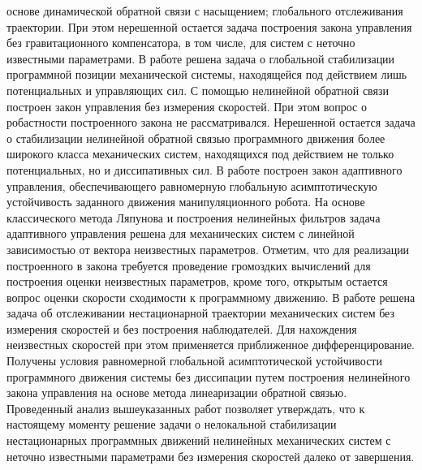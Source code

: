{основе динамической обратной связи с насыщением; глобального отслеживания траектории. При этом нерешенной остается задача построения закона управления без гравитационного компенсатора, в том числе, для систем с неточно известными параметрами. В работе \cite{burkov98} решена задача о глобальной стабилизации программной позиции механической системы, находящейся под действием лишь потенциальных и управляющих сил. С помощью нелинейной обратной связи построен закон управления без измерения скоростей. При этом вопрос о робастности построенного закона не рассматривался. Нерешенной остается задача о стабилизации нелинейной обратной связью программного движения более широкого класса механических систем, находящихся под действием не только потенциальных, но и диссипативных сил. В работе \cite{yarza11} построен закон адаптивного управления, обеспечивающего равномерную глобальную асимптотическую устойчивость заданного движения манипуляционного робота. На основе классического метода Ляпунова и построения нелинейных фильтров задача адаптивного управления решена для механических систем с линейной зависимостью от вектора неизвестных параметров. Отметим, что для реализации построенного в \cite{yarza11} закона требуется проведение громоздких вычислений для построения оценки неизвестных параметров, кроме того, открытым остается вопрос оценки скорости сходимости к программному движению. В работе \cite{loria98} решена задача об отслеживании нестационарной траектории механических систем без измерения скоростей и без построения наблюдателей.  Для нахождения неизвестных скоростей при этом применяется приближенное дифференцирование. Получены условия равномерной глобальной асимптотической устойчивости программного движения системы без диссипации путем построения нелинейного закона управления на основе метода линеаризации обратной 
	связью. Проведенный анализ вышеуказанных работ позволяет утверждать, что к настоящему моменту решение задачи о нелокальной стабилизации нестационарных программных движений нелинейных механических систем с неточно известными параметрами без измерения скоростей далеко от завершения.
	
}
